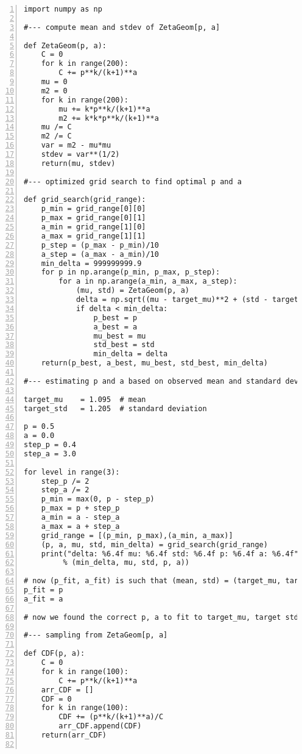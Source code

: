 \documentclass[oneside,10pt]{book}
\begin{document}
\begin{lstlisting}[numbers=left]
import numpy as np

#--- compute mean and stdev of ZetaGeom[p, a]

def ZetaGeom(p, a):
    C = 0
    for k in range(200):
        C += p**k/(k+1)**a
    mu = 0
    m2 = 0
    for k in range(200):
        mu += k*p**k/(k+1)**a
        m2 += k*k*p**k/(k+1)**a
    mu /= C
    m2 /= C
    var = m2 - mu*mu
    stdev = var**(1/2)
    return(mu, stdev)

#--- optimized grid search to find optimal p and a

def grid_search(grid_range):
    p_min = grid_range[0][0]
    p_max = grid_range[0][1]
    a_min = grid_range[1][0]
    a_max = grid_range[1][1]
    p_step = (p_max - p_min)/10
    a_step = (a_max - a_min)/10
    min_delta = 999999999.9
    for p in np.arange(p_min, p_max, p_step):
        for a in np.arange(a_min, a_max, a_step):
            (mu, std) = ZetaGeom(p, a)
            delta = np.sqrt((mu - target_mu)**2 + (std - target_std)**2)
            if delta < min_delta:
                p_best = p
                a_best = a
                mu_best = mu
                std_best = std
                min_delta = delta
    return(p_best, a_best, mu_best, std_best, min_delta)

#--- estimating p and a based on observed mean and standard deviation

target_mu    = 1.095  # mean
target_std   = 1.205  # standard deviation

p = 0.5
a = 0.0
step_p = 0.4
step_a = 3.0

for level in range(3):
    step_p /= 2
    step_a /= 2
    p_min = max(0, p - step_p)
    p_max = p + step_p
    a_min = a - step_a
    a_max = a + step_a
    grid_range = [(p_min, p_max),(a_min, a_max)]
    (p, a, mu, std, min_delta) = grid_search(grid_range)
    print("delta: %6.4f mu: %6.4f std: %6.4f p: %6.4f a: %6.4f" 
         % (min_delta, mu, std, p, a))

# now (p_fit, a_fit) is such that (mean, std) = (target_mu, target_std)
p_fit = p  
a_fit = a

# now we found the correct p, a to fit to target_mu, target stdev

#--- sampling from ZetaGeom[p, a]

def CDF(p, a):
    C = 0
    for k in range(100):
        C += p**k/(k+1)**a
    arr_CDF = []
    CDF = 0
    for k in range(100):
        CDF += (p**k/(k+1)**a)/C
        arr_CDF.append(CDF)
    return(arr_CDF)


\end{lstlisting}
\end{document}
